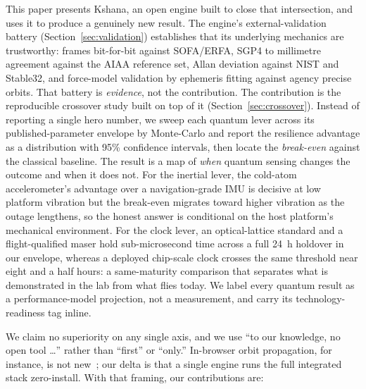 This paper presents Kshana, an open engine built to close that intersection, and
uses it to produce a genuinely new result. The engine's external-validation
battery (Section~\ref{sec:validation}) establishes that its underlying
mechanics are trustworthy: frames bit-for-bit against SOFA/ERFA, SGP4 to
millimetre agreement against the AIAA reference set, Allan deviation against
NIST and Stable32, and force-model validation by ephemeris fitting against
agency precise orbits. That battery is \emph{evidence}, not the
contribution. The contribution is the reproducible crossover study built on top
of it (Section~\ref{sec:crossover}). Instead of reporting a single hero number,
we sweep each quantum lever across its published-parameter envelope by
Monte-Carlo and report the resilience advantage as a distribution with 95\%
confidence intervals, then locate the \emph{break-even} against the classical
baseline. The result is a map of \emph{when} quantum sensing changes the outcome
and when it does not. For the inertial lever, the cold-atom accelerometer's
advantage over a navigation-grade IMU is decisive at low platform vibration but
the break-even migrates toward higher vibration as the outage lengthens, so the
honest answer is conditional on the host platform's mechanical environment. For
the clock lever, an optical-lattice standard and a flight-qualified maser hold
sub-microsecond time across a full 24~h holdover in our envelope, whereas a
deployed chip-scale clock crosses the same threshold near eight and a half
hours: a same-maturity comparison that separates what is demonstrated in the
lab from what flies today. We label every quantum result as a performance-model
projection, not a measurement, and carry its technology-readiness tag inline.

We claim no superiority on any single axis, and we use ``to our knowledge, no
open tool \ldots'' rather than ``first'' or ``only.'' In-browser orbit
propagation, for instance, is not new~\citep{satellitejs}; our delta is that a
single engine runs the full integrated stack zero-install. With that framing,
our contributions are:

